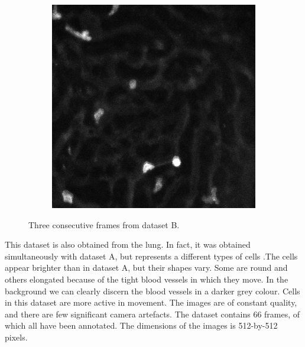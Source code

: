 \begin{figure}[h]
\begin{subfigure}{.32\textwidth}
		\end{subfigure}
		\hfill
		\begin{subfigure}{.32\textwidth}
		\includegraphics[width=\textwidth]{images/series30red025}
		\end{subfigure}
		\caption{Three consecutive frames from dataset B.}
		\label{fig:data_datasetB}
	\end{figure}
	
	This dataset is also obtained from the lung. In fact, it was obtained simultaneously with dataset A, but represents a different types of cells .The cells appear brighter than in dataset A, but their shapes vary. Some are round and others elongated because of the tight blood vessels  in which they move. In the background we can clearly discern the blood vessels in a darker grey colour. Cells in this dataset are more active in movement. The images are of constant quality, and there are few significant camera artefacts. The dataset contains 66 frames, of which all have been annotated. The dimensions of the images is 512-by-512 pixels.
	
	
